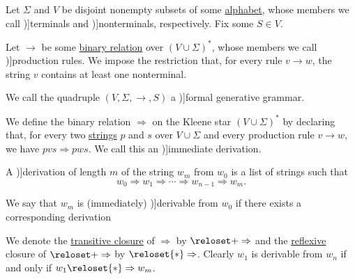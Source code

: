 \begin{definition}\label{def:formal_grammar}
  Let \( \Sigma \) and \( V \) be disjoint nonempty subsets of some \hyperref[def:formal_language]{alphabet}, whose members we call \term[ru=основные (символы) (\cite[27]{Гладкий1973ГрамматикиИЯзыки})]{terminals} and \term[ru=вспомогательные (символы) (\cite[27]{Гладкий1973ГрамматикиИЯзыки})]{nonterminals}, respectively. Fix some  \( S \in V \).

  Let \( {\to} \) be some \hyperref[def:binary_relation]{binary relation} over \( (V \cup \Sigma)^* \), whose members we call \term[ru=правила (\cite[27]{Гладкий1973ГрамматикиИЯзыки})]{production rules}. We impose the restriction that, for every rule \( v \to w \), the string \( v \) contains at least one nonterminal.

  We call the quadruple \( (V, \Sigma, \to, S) \) a \term[ru=(формальная) генеративная грамматика (\cite[10]{Гладкий1973ГрамматикиИЯзыки})]{formal generative grammar}.

  \begin{thmenum}
     We define the binary relation \( \Rightarrow \) on the Kleene star \( (V \cup \Sigma)^* \) by declaring that, for every two \hyperref[def:formal_language/string]{strings} \( p \) and \( s \) over \( V \cup \Sigma \) and every production rule \( v \to w \), we have \( pvs \Rightarrow pws \). We call this an \term[ru=непосредственный (вывод) (\cite[28]{Гладкий1973ГрамматикиИЯзыки})]{immediate derivation}.

    A \term[ru=вывод (\cite[27]{Гладкий1973ГрамматикиИЯзыки})]{derivation} of length \( m \) of the string \( w_m \) from \( w_0 \) is a list of strings such that
    \begin{equation}\label{eq:def:formal_grammar/derivation}
      w_0
      \Rightarrow
      w_1
      \Rightarrow
      \cdots
      \Rightarrow
      w_{n-1}
      \Rightarrow
      w_m.
    \end{equation}

    We say that \( w_m \) is (immediately) \term[ru=выводимая (цепочка) (\cite[27]{Гладкий1973ГрамматикиИЯзыки})]{derivable} from \( w_0 \) if there exists a corresponding derivation

    We denote the \hyperref[def:relation_closures/transitive]{transitive closure} of \( \Rightarrow \) by \( \reloset + \Rightarrow \) and the \hyperref[def:relation_closures/reflexive]{reflexive} closure of \( \reloset + \Rightarrow \) by \( \reloset {*} \Rightarrow \). Clearly \( w_1 \) is derivable from \( w_n \) if and only if \( w_1 \reloset {*} \Rightarrow w_m \).


\end{thmenum}
\end{definition}
